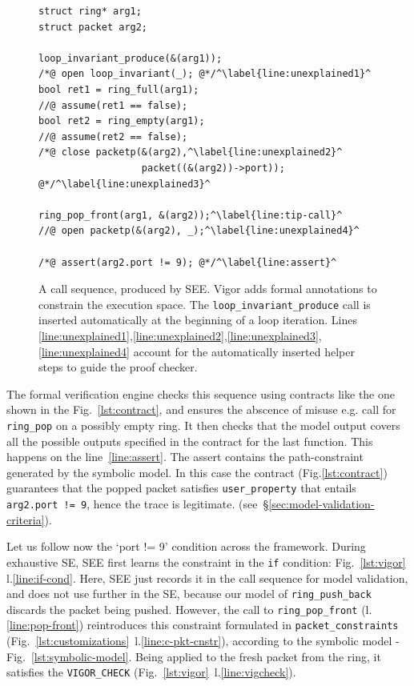 \documentclass[letterpaper,twocolumn,10pt]{article}
\newcommand{\code}[1]{\lstinline{#1}}
\begin{document}
\begin{figure}[h]
\begin{lstlisting}
struct ring* arg1;
struct packet arg2;

loop_invariant_produce(&(arg1));
/*@ open loop_invariant(_); @*/^\label{line:unexplained1}^
bool ret1 = ring_full(arg1);
//@ assume(ret1 == false);
bool ret2 = ring_empty(arg1);
//@ assume(ret2 == false);
/*@ close packetp(&(arg2),^\label{line:unexplained2}^
                  packet((&(arg2))->port)); @*/^\label{line:unexplained3}^

ring_pop_front(arg1, &(arg2));^\label{line:tip-call}^
//@ open packetp(&(arg2), _);^\label{line:unexplained4}^

/*@ assert(arg2.port != 9); @*/^\label{line:assert}^
\end{lstlisting}
  \caption{A call sequence, produced by SEE. Vigor adds formal annotations to
    constrain the execution space. The \code{loop_invariant_produce} call is
    inserted automatically at the beginning of a loop iteration. Lines
    \ref{line:unexplained1},\ref{line:unexplained2},\ref{line:unexplained3},\ref{line:unexplained4}
    account for the automatically inserted helper steps to guide the proof
    checker.}
  \label{lst:call-sequence}
\end{figure}

The formal verification engine checks this sequence using contracts like the one
shown in the Fig.~\ref{lst:contract}, and ensures the abscence of misuse e.g.
call for \code{ring_pop} on a possibly empty ring. It then checks that the model
output covers all the possible outputs specified in the contract for the last
function. This happens on the line~\ref{line:assert}. The assert contains the
path-constraint generated by the symbolic model. In this case the contract
(Fig.\ref{lst:contract}) guarantees that the popped packet satisfies
\code{user_property} that entails \code{arg2.port != 9}, hence the trace is
legitimate. (see~\S\ref{sec:model-validation-criteria}).

Let us follow now the `port != 9' condition across the framework. During
exhaustive SE, SEE first learns the constraint in the \code{if} condition:
Fig.~\ref{lst:vigor} l.\ref{line:if-cond}. Here, SEE just records it in the call
sequence for model validation, and does not use further in the SE, because our
model of \code{ring_push_back} discards the packet being pushed. However, the
call to \code{ring_pop_front} (l.\ref{line:pop-front}) reintroduces this
constraint formulated in \code{packet_constraints}
(Fig.~\ref{lst:customizations}~l.\ref{line:c-pkt-cnstr}), according to the
symbolic model - Fig.~\ref{lst:symbolic-model}. Being applied to the fresh
packet from the ring, it satisfies the \code{VIGOR_CHECK}
(Fig.~\ref{lst:vigor}~l.\ref{line:vigcheck}).
\end{document}
